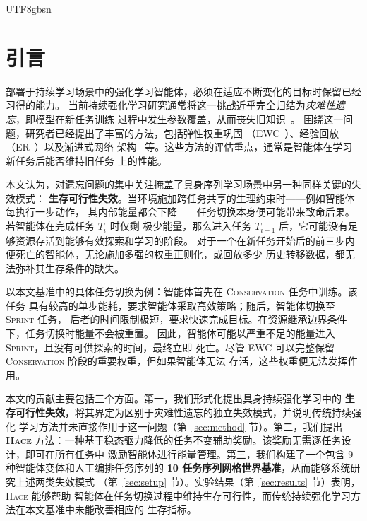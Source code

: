 \documentclass[sigplan,10pt]{acmart}
\newcommand{\hace}{\textsc{Hace}}
\begin{document}
\begin{CJK*}{UTF8}{gbsn}
\section{引言}
\label{sec:intro}

部署于持续学习场景中的强化学习智能体，必须在适应不断变化的目标时保留已经习得的能力。
当前持续强化学习研究通常将这一挑战近乎完全归结为\emph{灾难性遗忘}，即模型在新任务训练
过程中发生参数覆盖，从而丧失旧知识~\cite{Parisi2019,kirkpatrick2017,continualworld2021}。
围绕这一问题，研究者已经提出了丰富的方法，包括弹性权重巩固
（EWC~\cite{kirkpatrick2017}）、经验回放（ER~\cite{rolnick2019}）以及渐进式网络
架构~\cite{rusu2016} 等。这些方法的评估重点，通常是智能体在学习新任务后能否维持旧任务
上的性能。

本文认为，对遗忘问题的集中关注掩盖了具身序列学习场景中另一种同样关键的失效模式：
\textbf{生存可行性失效}。当环境施加跨任务共享的生理约束时——例如智能体每执行一步动作，
其内部能量都会下降——任务切换本身便可能带来致命后果。若智能体在完成任务 $T_i$ 时仅剩
极少能量，那么进入任务 $T_{i+1}$ 后，它可能没有足够资源存活到能够有效探索和学习的阶段。
对于一个在新任务开始后的前三步内便死亡的智能体，无论施加多强的权重正则化，或回放多少
历史转移数据，都无法弥补其生存条件的缺失。

以本文基准中的具体任务切换为例：智能体首先在 \textsc{Conservation} 任务中训练。该任务
具有较高的单步能耗，要求智能体采取高效策略；随后，智能体切换至 \textsc{Sprint} 任务，
后者的时间限制极短，要求快速完成目标。在资源继承边界条件下，任务切换时能量不会被重置。
因此，智能体可能以严重不足的能量进入 \textsc{Sprint}，且没有可供探索的时间，最终立即
死亡。尽管 EWC 可以完整保留 \textsc{Conservation} 阶段的重要权重，但如果智能体无法
存活，这些权重便无法发挥作用。

本文的贡献主要包括三个方面。第一，我们形式化提出具身持续强化学习中的
\textbf{生存可行性失效}，将其界定为区别于灾难性遗忘的独立失效模式，并说明传统持续强化
学习方法并未直接作用于这一问题（第~\ref{sec:method} 节）。第二，我们提出 \textbf{\hace{}}
方法：一种基于稳态驱力降低的任务不变辅助奖励。该奖励无需逐任务设计，即可在所有任务中
激励智能体进行能量管理。第三，我们构建了一个包含 9 种智能体变体和人工编排任务序列的
\textbf{10 任务序列网格世界基准}，从而能够系统研究上述两类失效模式
（第~\ref{sec:setup} 节）。实验结果（第~\ref{sec:results} 节）表明，\hace{} 能够帮助
智能体在任务切换过程中维持生存可行性，而传统持续强化学习方法在本文基准中未能改善相应的
生存指标。



\end{CJK*}
\end{document}

